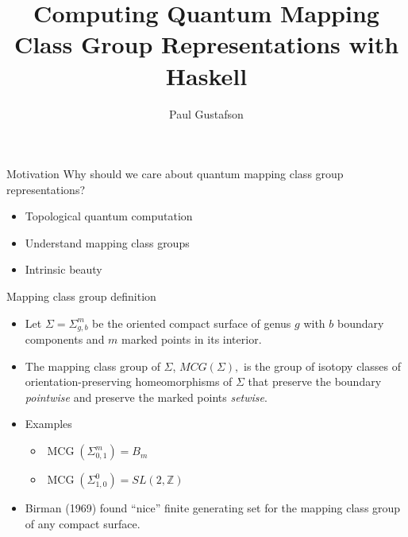 \documentclass{beamer}
\title{Computing Quantum Mapping Class Group Representations with Haskell}
\date{Paul Gustafson}
\DeclareMathOperator{\MCG}{MCG}
\begin{document}
\frame{\titlepage}

\begin{frame}{Motivation}
Why should we care about quantum mapping class group representations?
\begin{itemize}
\item Topological quantum computation
\pause
\vfill
\item Understand mapping class groups 
\vfill
\pause
\item Intrinsic beauty

\end{itemize}
\end{frame}

\begin{frame}{Mapping class group definition}
\begin{itemize}
\item
    Let $\Sigma = \Sigma_{g,b}^m$ be the oriented compact surface of genus $g$ with $b$ boundary components and $m$ marked points in its interior.

    \pause
\item
   The mapping class group of $\Sigma$, 
   $MCG(\Sigma),$
   is the group of isotopy classes of orientation-preserving homeomorphisms of $\Sigma$ that preserve the boundary \emph{pointwise} and preserve the marked points \emph{setwise}.
  
  \pause
  \item Examples
  \begin{itemize}
    \item $\MCG(\Sigma_{0,1}^m) = B_m$
    \item $\MCG(\Sigma_{1,0}^0) = SL(2,\mathbb Z)$
  \end{itemize}

\pause

  \item Birman (1969) found ``nice'' finite generating set for the mapping class group of any compact surface.
\end{itemize}
\end{frame}
\end{document}
